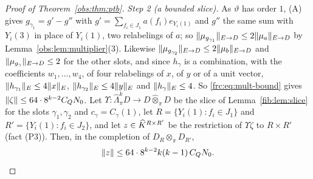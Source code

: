 \begin{proof}[Proof of Theorem~\ref{obs:thm:ptb}]
\emph{Step 2 (a bounded slice).} As $\vartheta$ has order $1$, (A) gives $g_{\gamma_1}=g'-g''$ with
$g'=\sum_{f_i\in J_1}a(f_i)e_{Y_i(1)}$ and $g''$ the same sum with $Y_i(3)$ in place of $Y_i(1)$, two relabelings of $a$;
so $\lVert \mu_{g_{\gamma_1}}\rVert_{E\to D}\le2\lVert \mu_a\rVert_{E\to D}$ by Lemma~\ref{obs:lem:multiplier}(3). Likewise
$\lVert \mu_{g_{\gamma_2}}\rVert_{E\to D}\le2\lVert \mu_b\rVert_{E\to D}$ and $\lVert \mu_{g_\gamma}\rVert_{E\to D}\le2$ for the other slots,
and since $h_\gamma$ is a combination, with the coefficients $w_1,\dots,w_4$, of four relabelings of $x$, of $y$ or of a
unit vector,
$\lVert h_{\gamma_1}\rVert_E\le4\lVert x\rVert_E$, $\lVert h_{\gamma_2}\rVert_E\le4\lVert y\rVert_E$ and $\lVert h_\gamma\rVert_E\le4$. So
\eqref{frc:eq:mult-bound} gives $\lVert \zeta\rVert\le64\cdot8^{k-2}C_QN_0$. Let $\Upsilon\colon\widehat\Lambda^k_\pi D\to
D\widehat\otimes_\pi D$ be the slice of Lemma~\ref{fib:lem:slice} for the slots $\gamma_1,\gamma_2$ and
$c_\gamma=C_\gamma(1)$, let $R=\{Y_i(1):f_i\in J_1\}$ and $R'=\{Y_i(1):f_i\in J_2\}$, and let $z\in\widehat K^{R\times R'}$ be the
restriction of $\Upsilon\zeta$ to $R\times R'$ (fact (P3)). Then, in the completion of $D_R\otimes_\pi D_{R'}$,
\begin{equation}\label{frc:eq:slice}
 \lVert z\rVert\le64\cdot8^{k-2}k(k-1)\,C_QN_0 .
\end{equation}


\end{proof}
